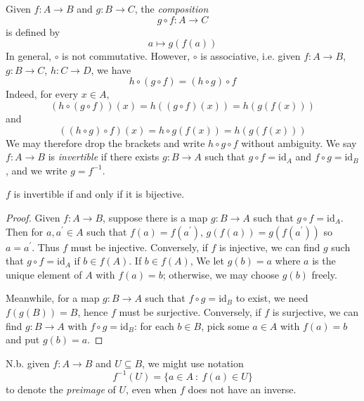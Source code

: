 \documentclass[10pt, a4paper, twoside]{report}
\begin{document}
Given \(f:A\to B\) and \(g:B\to C\), the \emph{composition}
\[g\circ f:A\to C\]
is defined by 
\[a\mapsto g(f(a))\]
In general, \(\circ\) is not commutative. However, \(\circ\) is associative, i.e. given \(f:A\to B\), \(g:B\to C\), \(h:C\to D\), we have 
\[h\circ(g\circ f)=(h\circ g)\circ f\]
Indeed, for every \(x\in A\),
\[(h\circ(g\circ f))(x)=h((g\circ f)(x))=h(g(f(x)))\]
and 
\[((h\circ g)\circ f)(x)=h\circ g(f(x))=h(g(f(x)))\]
We may therefore drop the brackets and write \(h\circ g\circ f\) without ambiguity. We say \(f:A\to B\) is \emph{invertible} if there exists \(g:B\to A\) such that \(g\circ f=\text{id}_A\) and \(f\circ g=\text{id}_B\), and we write \(g=f^{-1}\). 
\begin{proposition}
    \(f\) is invertible if and only if it is bijective.
\end{proposition}
\begin{proof}
    Given \(f:A\to B\), suppose there is a map \(g:B\to A\) such that \(g\circ f=\text{id}_A\). Then for \(a,a^\prime\in A\) such that \(f(a)=f(a^\prime)\), \(g(f(a))=g(f(a^\prime))\) so \(a=a^\prime\). Thus \(f\) must be injective. Conversely, if \(f\) is injective, we can find \(g\) such that \(g\circ f=\text{id}_A\) if \(b\in f(A)\). If \(b\in f(A)\), We let \(g(b)=a\) where \(a\) is the unique element of \(A\) with \(f(a)=b\); otherwise, we may choose \(g(b)\) freely.

    Meanwhile, for a map \(g:B\to A\) such that \(f\circ g=\text{id}_B\) to exist, we need \(f(g(B))=B\), hence \(f\) must be surjective. Conversely, if \(f\) is surjective, we can find \(g:B\to A\) with \(f\circ g=\text{id}_B\): for each \(b\in B\), pick some \(a\in A\) with \(f(a)=b\) and put \(g(b)=a\).
\end{proof}
N.b. given \(f:A\to B\) and \(U\subseteq B\), we might use notation 
\[f^{-1}(U)=\{a\in A\::\:f(a)\in U\}\]
to denote the \emph{preimage} of \(U\), even when \(f\) does not have an inverse.
\end{document}
